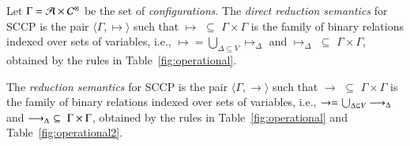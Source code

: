 \documentclass[main.tex]{subfiles}
\begin{document}
\begin{definition}[Reductions]\label{def:reductions}
Let $\Gamma = {\mathcal A} \times {\mathcal C}^\otimes$ be the set of \emph{configurations}.
The \emph{direct reduction semantics} for SCCP is the pair 
$\langle \Gamma,  \mapsto \rangle$
such that $\mapsto \, \, \subseteq \, \,\Gamma \times   \Gamma$ is the family 
 of binary relations indexed over sets of variables,
i.e., $\mapsto = \bigcup_{\Delta \subseteq V} \mapsto_\Delta$ and 
$\mapsto_\Delta \, \, \subseteq \, \,\Gamma \times \Gamma$, obtained by the rules in 
Table~\ref{fig:operational}.

The \emph{reduction semantics} for SCCP is the pair 
$\langle \Gamma,  \rightarrow \rangle$
such that $\rightarrow \, \, \subseteq \, \,\Gamma \times   \Gamma$ is the family 
 of binary relations indexed over sets of variables,
i.e., $\rightarrow = \bigcup_{\Delta \subseteq V} \longrightarrow_\Delta$ and 
$\longrightarrow_\Delta \, \, \subseteq \, \,\Gamma \times \Gamma$, obtained by the rules in 
Table~\ref{fig:operational} and Table~\ref{fig:operational2}.
\end{definition}

\def\odiv{\; {\ominus\hspace{-6pt} \div} \;}
\def\odivvv{\; {\ominus\hspace{-6pt} \div} \;}
\end{document}
